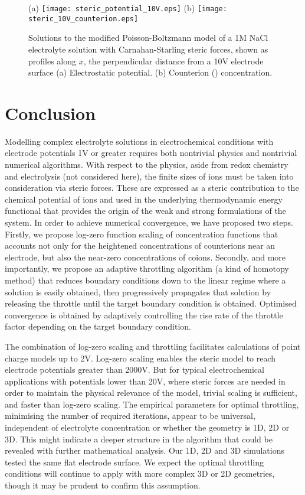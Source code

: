 \begin{figure}
\centering
(a)
\texttt{[image: steric\_potential\_10V.eps]}
(b)
\texttt{[image: steric\_10V\_counterion.eps]}
\caption{\label{fig_results_throttling}Solutions to the modified
  Poisson-Boltzmann model of a 1M NaCl electrolyte solution with
  Carnahan-Starling steric forces, shown as profiles along $x$, the
  perpendicular distance from a 10V electrode surface (a) Electrostatic
  potential. (b) Counterion () concentration. }
\end{figure}

\section{Conclusion}

Modelling complex electrolyte solutions in electrochemical conditions
with electrode potentials 1V or greater requires both nontrivial
physics and nontrivial numerical algorithms.
With respect to the
physics, aside from redox chemistry and electrolysis (not considered
here), the finite sizes of ions must be taken into consideration via
steric forces. These are expressed as a steric contribution to the
chemical potential of ions and used in the underlying thermodynamic
energy functional that provides the origin of the weak and strong
formulations of the system.
In order to achieve numerical convergence, we have proposed two
steps. Firstly, we propose log-zero function scaling of
concentration functions that accounts
not only for the heightened concentrations of counterions near an
electrode, but also the near-zero concentrations of coions. Secondly,
and more importantly, we propose an adaptive throttling algorithm (a kind of homotopy
method) that reduces boundary conditions 
down to the linear regime where a solution is easily obtained, then
progressively propagates that solution by releasing the throttle
until the target boundary condition is obtained. Optimised convergence
is obtained by adaptively controlling the rise rate of the throttle factor
depending on the target boundary condition.

The combination of
log-zero scaling and throttling facilitates calculations of point
charge models up to 2V. Log-zero scaling enables
the steric model to reach electrode potentials greater than 2000V.
But for typical electrochemical applications with potentials lower than 20V,
where steric forces are needed in order to maintain the physical relevance
of the model, trivial scaling is sufficient, and faster than log-zero scaling.
The empirical parameters for optimal throttling, minimising the number of
required iterations, appear to be universal, independent of
electrolyte concentration or whether the geometry is 1D, 2D or 3D.
This might indicate a deeper structure in the algorithm that could be
revealed with further mathematical analysis. Our 1D, 2D and 3D
simulations tested the same flat electrode surface. We expect the optimal throttling
conditions will continue to apply with more complex 3D or 2D
geometries, though it may be prudent to confirm this assumption.

